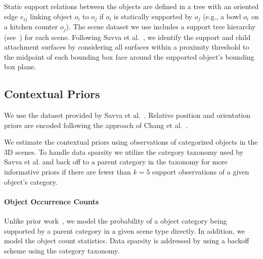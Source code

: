 \documentclass{sigchi}
\begin{document}
Static support relations between the objects are defined in a tree with an oriented edge $e_{ij}$ linking object $o_i$ to $o_j$ if $o_i$ is statically supported by $o_j$ (e.g., a bowl $o_i$ on a kitchen counter $o_j$).  The scene dataset we use includes a support tree hierarchy (see~) for each scene.  Following Savva et al.~\cite{savva2015semgeo}, we identify the support and child attachment surfaces by considering all surfaces within a proximity threshold to the midpoint of each bounding box face around the supported object's bounding box plane.

\subsection{Contextual Priors}
We use the dataset provided by Savva et al.~\cite{savva2015semgeo}. Relative position and orientation priors are encoded following the approach of Chang et al.~\cite{chang2014spatial}.

We estimate the contextual priors using observations of categorized objects in the 3D scenes. To handle data sparsity we utilize the category taxonomy used by Savva et al. and back off to a parent category in the taxonomy for more informative priors if there are fewer than $k=5$ support observations of a given object's category.

\paragraph{Object Occurrence Counts}
Unlike prior work~\cite{fisher2012example,yu2014clutterpalette,chang2014spatial}, we model the probability of a object category being supported by a parent category in a given scene type directly.  In addition, we model the object count statistics. Data sparsity is addressed by using a backoff scheme using the category taxonomy.
\end{document}
